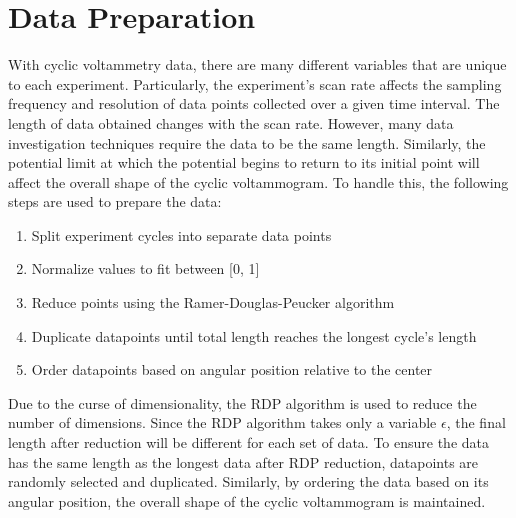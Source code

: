 \section{Data Preparation}
With cyclic voltammetry data, there are many different variables that are unique to each experiment. Particularly, the experiment's scan rate affects the sampling frequency and resolution of data points collected over a given time interval. The length of data obtained changes with the scan rate. However, many data investigation techniques require the data to be the same length. Similarly, the potential limit at which the potential begins to return to its initial point will affect the overall shape of the cyclic voltammogram. To handle this, the following steps are used to prepare the data:
\begin{enumerate}
    \item Split experiment cycles into separate data points
    \item Normalize values to fit between [0, 1]
    \item Reduce points using the Ramer-Douglas-Peucker algorithm
    \item Duplicate datapoints until total length reaches the longest cycle's length
    \item Order datapoints based on angular position relative to the center
\end{enumerate}
Due to the curse of dimensionality, the RDP algorithm is used to reduce the number of dimensions. Since the RDP algorithm takes only a variable $\epsilon$, the final length after reduction will be different for each set of data. To ensure the data has the same length as the longest data after RDP reduction, datapoints are randomly selected and duplicated. Similarly, by ordering the data based on its angular position, the overall shape of the cyclic voltammogram is maintained.
